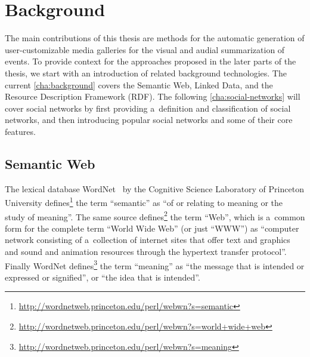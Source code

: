 

\chapter{Background} \label{cha:background}

\ifpdf
    \graphicspath{{2_background/figures/PNG/}{2_background/figures/PDF/}{2_background/figures/}}
\else
    \graphicspath{{2_background/figures/EPS/}{2_background/figures/}}
\fi


The main contributions of this thesis are methods for the automatic generation of
user-customizable media galleries for the visual and audial summarization of events.
To provide context for the approaches proposed in the later parts of the thesis,
we start with an introduction of related background technologies.
The current \autoref{cha:background} covers the Semantic Web, Linked Data,
and the Resource Description Framework (RDF).
The following \autoref{cha:social-networks} will cover social networks
by first providing a~definition and classification of social networks,
and then introducing popular social networks and some of their core features.

\section{Semantic Web}
The lexical database WordNet~\cite{Fellbaum1998} by the Cognitive Science Laboratory
of Princeton University defines\footnote{\url{http://wordnetweb.princeton.edu/perl/webwn?s=semantic}}
the term ``semantic'' as ``of or relating to meaning or the study of meaning''.
The same source defines\footnote{\url{http://wordnetweb.princeton.edu/perl/webwn?s=world+wide+web}}
the term ``Web'', which is a~common form for the complete term ``World Wide Web'' (or just ``WWW'') as
``computer network consisting of a~collection of internet sites that offer text and graphics and
sound and animation resources through the hypertext transfer protocol''.
Finally WordNet defines\footnote{\url{http://wordnetweb.princeton.edu/perl/webwn?s=meaning}}
the term ``meaning'' as ``the message that is intended or expressed or signified'', or
``the idea that is intended''.

